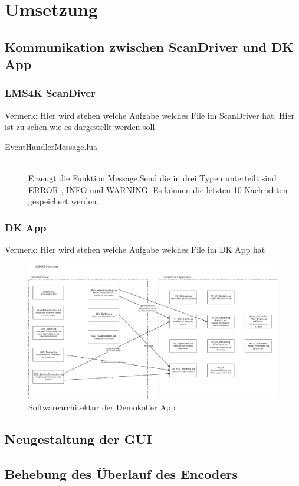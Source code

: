 \chapter{Umsetzung}
\doublespacing
\section{Kommunikation zwischen ScanDriver und DK App}
\subsection{LMS4K ScanDiver}
Vermerk: Hier wird stehen welche Aufgabe welches File im ScanDriver hat. Hier ist zu sehen wie es dargestellt werden soll

\begin{description}
\item[EventHandlerMessage.lua]\hfill \\
Erzeugt die Funktion Message.Send die in drei Typen unterteilt sind ERROR , INFO  und WARNING. Es können die letzten 10 Nachrichten gespeichert werden. 
\end{description}

\subsection{DK App}
Vermerk: Hier wird stehen welche Aufgabe welches File im DK App hat




\begin{figure}[h!]
\includegraphics[width=15cm]{Bilder/SW - LMS4000 Democase (1).pdf}
\caption{Softwarearchitektur der Demokoffer App}
\label{Softwarearchitektur der Demokoffer App}
\end{figure}


\section{Neugestaltung der GUI}
\section{Behebung des Überlauf des Encoders}
